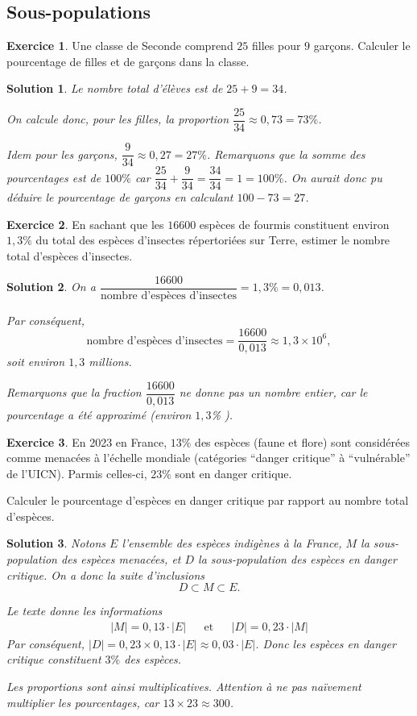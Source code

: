 \documentclass[a4paper, 14pt]{extarticle}
\theoremstyle{plain}
\newtheorem*{sol}{Solution}
\theoremstyle{definition}
\newtheorem{ex}{Exercice}
\newif\ifsolutions
\newcommand{\exe}[2]{
		\begin{ex} #1  \end{ex}
		\begin{sol} #2 \end{sol}
	}
\newcommand{\exe}[2]{
		\begin{ex} #1  \end{ex}
	}
\begin{document}
\pagestyle{fancy}
\fancyhead[C]{\textbf{Statistiques 1\ifsolutions -- Solutions  \fi}}
\fancyhead[R]{\today}

\subsection*{Sous-populations}

\exe{
        Une classe de Seconde comprend $25$ filles pour $9$ garçons.
        Calculer le pourcentage de filles et de garçons dans la classe.
}{
	Le nombre total d'élèves est de $25+9 = 34$.
	
	On calcule donc, pour les filles, la proportion $\dfrac{25}{34} \approx 0,73 = 73\%$.
	
	Idem pour les garçons, $\dfrac{9}{34} \approx 0,27 = 27\%$. 
	Remarquons que la somme des pourcentages est de $100\%$ car $\dfrac{25}{34} + \dfrac{9}{34} = \dfrac{34}{34} = 1 = 100\%$.
	On aurait donc pu déduire le pourcentage de garçons en calculant $100 - 73 = 27$.
}

\exe{
   En sachant que les $16 600$ espèces de fourmis constituent environ $1{,}3\%$ du total des espèces d'insectes répertoriées sur Terre, estimer le nombre total d'espèces d'insectes. 
}{
	On a $\dfrac{16 600}{\text{nombre d'espèces d'insectes}} = 1,3\% = 0,013$.
	
	Par conséquent, 
		\[ \text{nombre d'espèces d'insectes} = \dfrac{16600}{0,013} \approx 1,3 \times 10^{6}, \]
	soit environ $1,3$ millions.
	
	Remarquons que la fraction $\dfrac{16600}{0,013}$ ne donne pas un nombre entier, car le pourcentage a été approximé (\og \emph{environ} $1,3$\% \fg).
}


\exe{
  En 2023 en France, $13\%$ des espèces (faune et flore) sont considérées comme menacées à l'échelle mondiale (catégories ``danger critique'' à ``vulnérable'' de l'UICN).
  Parmis celles-ci, $23\%$ sont en danger critique.
  
  Calculer le pourcentage d'espèces en danger critique par rapport au nombre total d'espèces.
}{
	Notons $E$ l'ensemble des espèces indigènes à la France, $M$ la sous-population des espèces menacées, et $D$ la sous-population des espèces en danger critique.
	On a donc la suite d'inclusions
		\[ D \subset M \subset E. \]
	
	Le texte donne les informations
		\begin{align*}
			|M| = 0,13 \cdot |E| && \text{et} && |D| = 0,23 \cdot |M|
		\end{align*}
	Par conséquent, $|D| = 0,23 \times 0,13 \cdot |E| \approx 0,03 \cdot |E|$.
	Donc les espèces en danger critique constituent $3\%$ des espèces.

	Les proportions sont ainsi multiplicatives. Attention à ne pas naïvement multiplier les pourcentages, car $13\times 23 \approx 300$.
}
\end{document}
